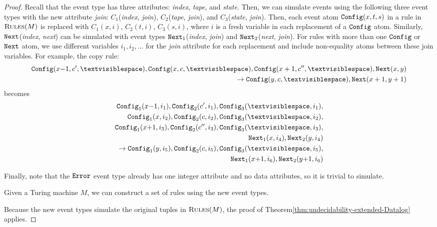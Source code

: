 \begin{proof}
Recall that the {\Config} event type has three attributes:
\mbox{\em index}, \mbox{\em tape}, and \mbox{\em state}.
Then, we can simulate {\Config} events using the following three event types
with the new attribute {\em join}:
$C_1$(\mbox{\em index}, \mbox{\em join}),
$C_2$(\mbox{\em tape}, \mbox{\em join}), and
$C_3$(\mbox{\em state}, \mbox{\em join}).
Then,
each event atom $\texttt{Config}(x,t,s)$
in a rule in $\textsc{Rules}(M)$
is replaced with
$C_1(x,i)$, $C_2(t,i)$, $C_3(s,i)$,
where $i$ is a fresh variable in each replacement
of a $\texttt{Config}$ atom.
Similarly,
$\texttt{Next}$(\mbox{\em index}, \mbox{\em next})
can be simulated with event types
$\texttt{Next}_1$(\mbox{\em index}, \mbox{\em join}) and
$\texttt{Next}_2$(\mbox{\em next}, \mbox{\em join}).
For rules with more than one $\texttt{Config}$ or $\texttt{Next}$ atom,
we use different variables $i_1,i_2,\dots$ for the {\em join} attribute
for each replacement
and include non-equality atoms between these join variables.
For example,
the copy rule:
\begin{align}
    \begin{split}
\Config(x{-}1,c',\blank), \Config(x,c,\blank), \Config(x+1,c'',\blank), \Next(x,y)\\
\rightarrow \Config(y,c,\blank), \Next(x+1,y+1)
    \end{split}
\end{align}
becomes
\begin{align}
    \begin{split}
\Config_1(x{-}1,i_1),   \Config_2(c',i_1),\Config_3(\blank,i_1),\\
\Config_1(x,i_2),       \Config_2(c,i_2),\Config_3(\blank,i_2),\\
\Config_1(x{+}1,i_3),   \Config_2(c'',i_3),\Config_3(\blank,i_3),\\
\Next_1(x,i_4), \Next_2(y,i_4)\\
\rightarrow
\Config_1(y,i_5), \Config_2(c,i_5),\Config_3(\blank,i_5),\\
\Next_1(x{+}1,i_6), \Next_2(y{+}1,i_6)
    \end{split}
\end{align}

Finally, note that the $\texttt{\tt Error}$ event type already
has one integer attribute and no data attributes,
so it is trivial to simulate.

Given a Turing machine $M$,
we can construct a set of rules
using the new event types.

Because the new event types simulate
the original tuples in $\textsc{Rules}(M)$,
the proof of Theorem\:\ref{thm:undecidability-extended-Datalog} applies.
\end{proof}

